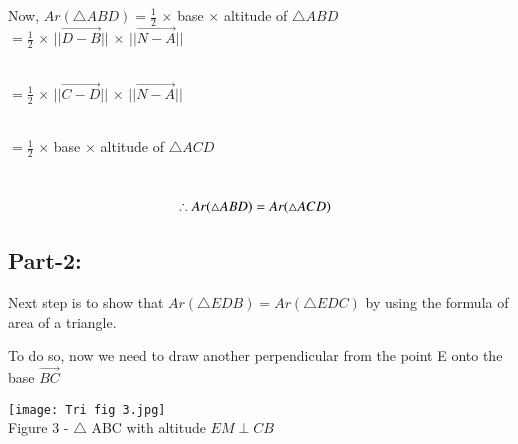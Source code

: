 \documentclass[journal,12pt,twocolumn]{IEEEtran}
\begin{document}
\hspace{0.1cm}Now, $Ar(\triangle ABD) = \frac{1}{2}$ $\times$ base $\times$ altitude of $\triangle ABD$\\
\centering
\vspace{0.25cm}
\hspace{1.6cm}$= \frac{1}{2}$ $\times$ $||{\vec{D-B}}||$ $\times$ $||{\vec{N-A}}||$\\
\vspace{0.25cm}
\
\hspace{2.9cm}\raggedright{$= \frac{1}{2}$ $\times$ $||{\vec{C-D}}||$ $\times$ $||{\vec{N-A}}||$} \vspace{0.25cm}\\
\hspace{3.5cm}{[$\because$ ${||\vec{D}-\vec{B}||}={||\vec{C}-\vec{D}||}$]}\\
\vspace{0.25cm}
\centering
\raggedright\hspace{3cm}$= \frac{1}{2}$ $\times$ base $\times$ altitude of $\triangle ACD$\\
\vspace{0.25cm}
\raggedright\hspace{2.95cm}{$=Ar(\triangle ACD)$}\\
\vspace{0.25cm}
\centering
\begin{align} 
\therefore Ar(\triangle ABD)=Ar(\triangle ACD) \hspace{0.25cm}
\label{eq:1}
\end{align}
\raggedright{\subsection{Part-2:}}

Next step is to show that $Ar(\triangle EDB)=Ar(\triangle EDC)$ by using the formula of area of a triangle.\\
\vspace{0.25cm}

To do so, now we need to draw another perpendicular from the point E onto the base $\overrightarrow{BC}$\\
\vspace{0.25cm}
\begin{center}
\texttt{[image: Tri fig 3.jpg]}\\
Figure 3 - $\triangle$ ABC with altitude ${EM} \perp {CB}$ \\
\end{center}
\end{document}
